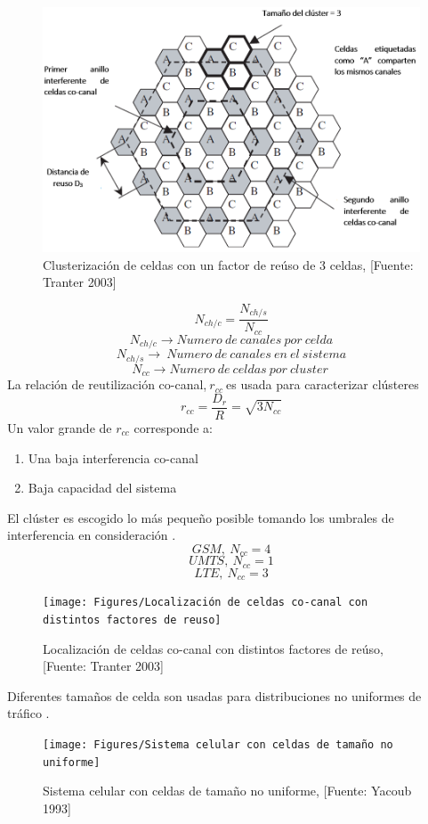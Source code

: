 \begin{figure}[th]
    \centering
    \includegraphics[scale=.5]{Figures/Clusterización de celdas con un factor de reúso de 3 celdas}
    \decoRule
    \caption[Clusterización de celdas con un factor de reúso de 3 celdas]{Clusterización de celdas con un factor de reúso de 3 celdas, [Fuente: Tranter 2003]}
    \label{fig:clusterizacion}
\end{figure}
\begin{equation}
N_{ch/c}=\frac{N_{ch/s}}{N_{cc}} 
\label{eqn:Nch}
\end{equation}
\[N_{ch/c}\to Numero\ de\ canales\ por\ celda\] 
\[N_{ch/s}\to \ Numero\ de\ canales\ en\ el\ sistema\] 
\[N_{cc}\to Numero\ de\ celdas\ por\ cluster\ \] 
La relación de reutilización co-canal,$\ r_{cc}\ $es usada para caracterizar clústeres\
\begin{equation}
r_{cc}=\frac{D_r}{R}=\sqrt{3N_{cc}}
\label{eqn:}
\end{equation}
Un valor grande de $r_{cc}$ corresponde a:
\begin{enumerate}
\item  Una baja interferencia co-canal
\item  Baja capacidad del sistema
\end{enumerate}
El clúster es escogido lo más pequeño posible tomando los umbrales de interferencia en consideración \parencite{Correia2018}.
\[GSM,\ {N}_{cc}=4\] 
\[UMTS,\ {N}_{cc}=1\] 
\[LTE,\ {N}_{cc}=3\] 
\begin{figure}[th]
\centering
\texttt{[image: Figures/Localización de celdas co-canal con distintos factores de reuso]}
\decoRule
\caption[Localización de celdas co-canal con distintos factores de reúso]{Localización de celdas co-canal con distintos factores de reúso, [Fuente: Tranter 2003]}
\label{fig:celdascocanal}
\end{figure}
Diferentes tamaños de celda son usadas para distribuciones no uniformes de tráfico \parencite{TurjmanSmallCells}.\newline
\begin{figure}[th]
\centering
\texttt{[image: Figures/Sistema celular con celdas de tamaño no uniforme]}
\decoRule
\caption[Sistema celular con celdas de tamaño no uniforme]{Sistema celular con celdas de tamaño no uniforme, [Fuente: Yacoub 1993]}
\label{fig:nouniformcells}
\end{figure}

